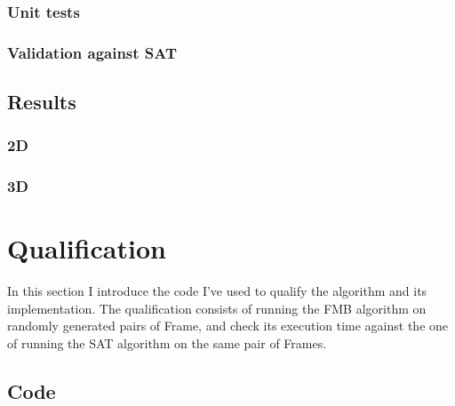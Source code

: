 \documentclass[12pt, a4paper]{article}
\begin{document}
\subsubsection{Unit tests}

\begin{scriptsize}
\begin{ttfamily}

\end{ttfamily}
\end{scriptsize}

\subsubsection{Validation against SAT}

\begin{scriptsize}
\begin{ttfamily}

\end{ttfamily}
\end{scriptsize}

\subsection{Results}

\subsubsection{2D}

\subsubsection{3D}

\section{Qualification}

In this section I introduce the code I've used to qualify the algorithm and its implementation. The qualification consists of running the FMB algorithm on randomly generated pairs of Frame, and check its execution time against the one of running the SAT algorithm on the same pair of Frames.\\

\subsection{Code}

\begin{scriptsize}
\begin{ttfamily}

\end{ttfamily}
\end{scriptsize}
\end{document}
